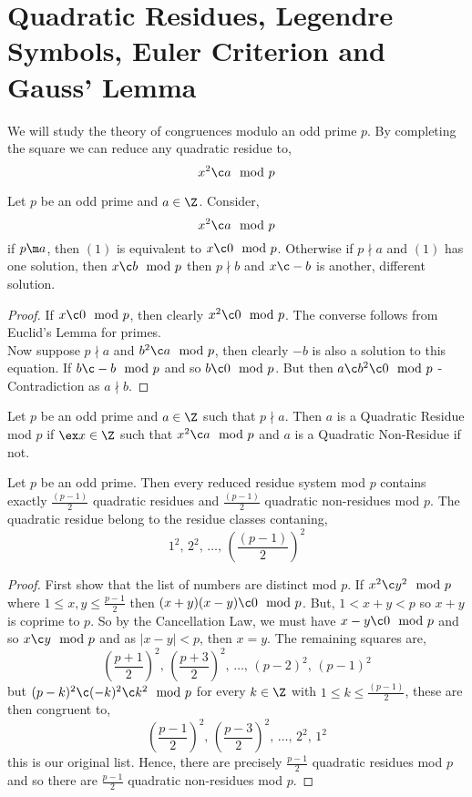 
\section{Quadratic Residues, Legendre Symbols, Euler Criterion and Gauss' Lemma}
We will study the theory of congruences modulo an odd prime $p$. By completing the square we can reduce any quadratic residue to,
$$ x^2 \c a \mod p $$

\begin{nlemma}
  Let $p$ be an odd prime and $a \in \Z$. Consider,
  \begin{equation}
    x^2 \c a \mod p
  \end{equation}
  if $p \m a$, then $(1)$ is equivalent to $x \c 0 \mod p$. Otherwise if $p \nmid a$ and $(1)$ has one solution, then $x \c b \mod p$ then $p \nmid b$ and $x \c -b$ is another, different solution.
\end{nlemma}
\begin{proof}
  If $x \c 0 \mod p$, then clearly $x^2 \c 0 \mod p$. The converse follows from Euclid's Lemma for primes.\\
  Now suppose $p \nmid a$ and $b^2 \c a \mod p$, then clearly $-b$ is also a solution to this equation. If $b \c - b \mod p$ and so $b \c 0 \mod p$. But then $a \c b^2 \c 0 \mod p$ - Contradiction as $a \nmid b$.
\end{proof}

\begin{ndefi}
  Let $p$ be an odd prime and $a \in \Z$ such that $p \nmid a$. Then $a$ is a Quadratic Residue mod $p$ if $\ex x \in \Z$ such that $x^2 \c a \mod p$ and $a$ is a Quadratic Non-Residue if not.
\end{ndefi}

\begin{nprop}
  Let $p$ be an odd prime. Then every reduced residue system mod $p$ contains exactly $\frac{(p-1)}{2}$ quadratic residues and $\frac{(p-1)}{2}$ quadratic non-residues mod $p$. The quadratic residue belong to the residue classes contaning,
  $$ 1^2,\,2^2,\,\dots,\,\left(\frac{(p-1)}{2}\right)^2 $$
\end{nprop}
\begin{proof}
  First show that the list of numbers are distinct mod $p$. If $x^2 \c y^2 \mod p$ where $1 \le x, y \le \frac{p-1}{2}$ then $(x+y)(x-y) \c 0 \mod p$. But, $1 < x+ y < p$ so $x + y$ is coprime to $p$. So by the Cancellation Law, we must have $x - y \c 0 \mod p$ and so $x \c y \mod p$ and as $|x - y| < p$, then $x = y$. The remaining squares are,
  $$ \left(\frac{p+1}{2}\right)^2,\,\left(\frac{p+3}{2}\right)^2,\,\dots,\, (p - 2)^2,\, (p-1)^2 $$
  but $(p - k)^2 \c (-k)^2 \c k^2 \mod p$ for every $k \in \Z$ with $1 \le k \le \frac{(p - 1)}{2}$, these are then congruent to,
  $$ \left(\frac{p-1}{2}\right)^2,\,\left(\frac{p-3}{2}\right)^2,\,\dots,\, 2^2,\, 1^2 $$
  this is our original list. Hence, there are precisely $\frac{p-1}{2}$ quadratic residues mod $p$ and so there are $\frac{p-1}{2}$ quadratic non-residues mod $p$.
\end{proof}

